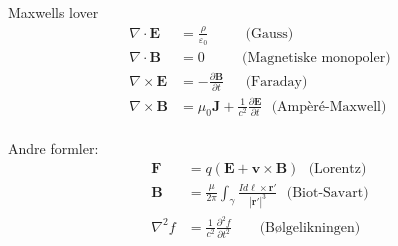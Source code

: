 \documentclass[twoside,utf8]{article}
\begin{document}
\begin{multicols}{2}
Maxwells lover
\begin{equation*}
\begin{aligned}
\nabla \cdot \mathbf{E} &= \frac{\rho}{\varepsilon_0} \ \ \ \ \ \ \ \ \ \ \ \ \text{(Gauss)} \\
\nabla \cdot \mathbf{B} &= 0 \ \ \ \ \ \ \ \ \ \ \ \ \text{(Magnetiske monopoler)}  \\
\nabla \times \mathbf{E} &= -\frac{\partial \mathbf{B}}{\partial t}  \ \ \ \ \ \ \ \text{(Faraday)} \\
\nabla \times \mathbf{B} &= \mu_0 \mathbf{J} + \frac{1}{c^2}\frac{\partial \mathbf{E}}{\partial t} \ \ \  \text{(Ampèré-Maxwell)}   \\
\end{aligned}
\end{equation*}

Andre formler:
\begin{equation*}
\begin{aligned}
\mathbf{F} &= q\left(\mathbf{E}+\mathbf{v}\times \mathbf{B}\right) \ \ \  \text{(Lorentz)}  \\
\mathbf{B} &= \frac{\mu}{2\pi}\int_\gamma \frac{I d\mathbf{\ell} \times \mathbf{r}'}{|\mathbf{r}'|^3} \ \ \  \text{(Biot-Savart)}  \\
\nabla^2 f &= \frac{1}{c^2} \frac{\partial^2 f}{\partial t^2} \ \ \ \ \ \ \ \ \ \text{(Bølgelikningen)}
\end{aligned}
\end{equation*}

\end{multicols}



\begin{comment}
	$$
  L_+' = \frac{ L_+ }{ \sqrt{1-\frac{0^2}{c^2}} } = L_+
  $$
  sett fra punktpartikkelen. På samme måte er avstanden mellom de negative ladningene, som for oss er $L_-$, gitt ved
  $$
  L_-' = L_- \sqrt{1-\frac{v^2}{c^2}}.
  $$
  Det betyr at ladningstettheten i ledningen sett fra punktpartikkelen er
  $$
  \lambda' = \lambda\sqrt{1-\frac{v^2}{c^2}}-\frac{\lambda}{\sqrt{1-\frac{v^2}{c^2}}}
  $$
  som hvis $v$ er mye mindre enn $c$ gir
  $$
  \lambda' = -\lambda\frac{v^2}{c^2}.
  $$
  Dette oppretter et elektrisk felt
  $$
  E = \frac{1}{\varepsilon_0}\frac{\lambda'}{2\pi r} = -\frac{1}{2\pi r}\frac{\lambda v^2}{\varepsilon_0c^2}
  $$
  som gir opphav til en kraft
  $$
  F = -q\frac{1}{2\pi r}\frac{\lambda v^2}{\varepsilon_0c^2}
  $$
\end{comment}
\end{document}
